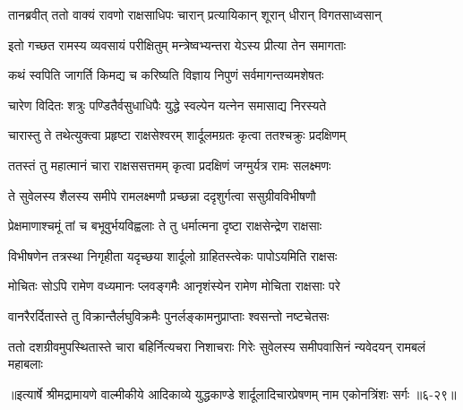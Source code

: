 \twolineshloka
{तानब्रवीत् ततो वाक्यं रावणो राक्षसाधिपः}
{चारान् प्रत्यायिकान् शूरान् धीरान् विगतसाध्वसान्} %

\twolineshloka
{इतो गच्छत रामस्य व्यवसायं परीक्षितुम्}
{मन्त्रेष्वभ्यन्तरा येऽस्य प्रीत्या तेन समागताः} %

\twolineshloka
{कथं स्वपिति जागर्ति किमद्य च करिष्यति}
{विज्ञाय निपुणं सर्वमागन्तव्यमशेषतः} %

\twolineshloka
{चारेण विदितः शत्रुः पण्डितैर्वसुधाधिपैः}
{युद्धे स्वल्पेन यत्नेन समासाद्य निरस्यते} %

\twolineshloka
{चारास्तु ते तथेत्युक्त्वा प्रहृष्टा राक्षसेश्वरम्}
{शार्दूलमग्रतः कृत्वा ततश्चक्रुः प्रदक्षिणम्} %

\twolineshloka
{ततस्तं तु महात्मानं चारा राक्षससत्तमम्}
{कृत्वा प्रदक्षिणं जग्मुर्यत्र रामः सलक्ष्मणः} %

\twolineshloka
{ते सुवेलस्य शैलस्य समीपे रामलक्ष्मणौ}
{प्रच्छन्ना ददृशुर्गत्वा ससुग्रीवविभीषणौ} %

\twolineshloka
{प्रेक्षमाणाश्चमूं तां च बभूवुर्भयविह्वलाः}
{ते तु धर्मात्मना दृष्टा राक्षसेन्द्रेण राक्षसाः} %

\twolineshloka
{विभीषणेन तत्रस्था निगृहीता यदृच्छया}
{शार्दूलो ग्राहितस्त्वेकः पापोऽयमिति राक्षसः} %

\twolineshloka
{मोचितः सोऽपि रामेण वध्यमानः प्लवङ्गमैः}
{आनृशंस्येन रामेण मोचिता राक्षसाः परे} %

\twolineshloka
{वानरैरर्दितास्ते तु विक्रान्तैर्लघुविक्रमैः}
{पुनर्लङ्कामनुप्राप्ताः श्वसन्तो नष्टचेतसः} %

\twolineshloka
{ततो दशग्रीवमुपस्थितास्ते चारा बहिर्नित्यचरा निशाचराः}
{गिरेः सुवेलस्य समीपवासिनं न्यवेदयन् रामबलं महाबलाः} %


॥इत्यार्षे श्रीमद्रामायणे वाल्मीकीये आदिकाव्ये युद्धकाण्डे शार्दूलादिचारप्रेषणम् नाम एकोनत्रिंशः सर्गः ॥६-२९॥
